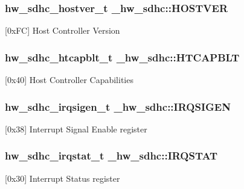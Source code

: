 \subsubsection[{\texorpdfstring{H\+O\+S\+T\+V\+ER}{HOSTVER}}]{ {\bf hw\+\_\+sdhc\+\_\+hostver\+\_\+t} \+\_\+hw\+\_\+sdhc\+::\+H\+O\+S\+T\+V\+ER}\hypertarget{struct__hw__sdhc_a558556e8b8d2769da067d0dd6e6808a5}{}\label{struct__hw__sdhc_a558556e8b8d2769da067d0dd6e6808a5}
\mbox{[}0x\+FC\mbox{]} Host Controller Version 
\subsubsection[{\texorpdfstring{H\+T\+C\+A\+P\+B\+LT}{HTCAPBLT}}]{ {\bf hw\+\_\+sdhc\+\_\+htcapblt\+\_\+t} \+\_\+hw\+\_\+sdhc\+::\+H\+T\+C\+A\+P\+B\+LT}\hypertarget{struct__hw__sdhc_a977b0efe6945543ca6e85328a83be9f8}{}\label{struct__hw__sdhc_a977b0efe6945543ca6e85328a83be9f8}
\mbox{[}0x40\mbox{]} Host Controller Capabilities 
\subsubsection[{\texorpdfstring{I\+R\+Q\+S\+I\+G\+EN}{IRQSIGEN}}]{ {\bf hw\+\_\+sdhc\+\_\+irqsigen\+\_\+t} \+\_\+hw\+\_\+sdhc\+::\+I\+R\+Q\+S\+I\+G\+EN}\hypertarget{struct__hw__sdhc_ab8028ebb316a3cfad78ad1048d151378}{}\label{struct__hw__sdhc_ab8028ebb316a3cfad78ad1048d151378}
\mbox{[}0x38\mbox{]} Interrupt Signal Enable register 
\subsubsection[{\texorpdfstring{I\+R\+Q\+S\+T\+AT}{IRQSTAT}}]{ {\bf hw\+\_\+sdhc\+\_\+irqstat\+\_\+t} \+\_\+hw\+\_\+sdhc\+::\+I\+R\+Q\+S\+T\+AT}\hypertarget{struct__hw__sdhc_a2bfdd6289900835c0c8fddba5ad280f1}{}\label{struct__hw__sdhc_a2bfdd6289900835c0c8fddba5ad280f1}
\mbox{[}0x30\mbox{]} Interrupt Status register 
